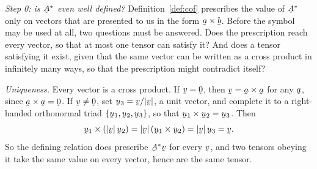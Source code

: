 \begin{solution}
\emph{Step 0: is $\bA^{*}$ even well defined?}
Definition~\ref{def:cof} prescribes the value of $\bA^{*}$ only on vectors
that are presented to us in the form $\ba\times\bb$. Before the symbol may
be used at all, two questions must be answered. Does the prescription reach
every vector, so that at most one tensor can satisfy it? And does a tensor
satisfying it exist, given that the same vector can be written as a cross
product in infinitely many ways, so that the prescription might contradict
itself?

\emph{Uniqueness.} Every vector is a cross product. If $\bv=\bze$, then
$\bv=\ba\times\ba$ for any $\ba$, since $\ba\times\ba=\bze$. If
$\bv\neq\bze$, set $\bu_{3}=\bv/|\bv|$, a unit vector, and complete it to a
right-handed orthonormal triad $\{\bu_{1},\bu_{2},\bu_{3}\}$, so that
$\bu_{1}\times\bu_{2}=\bu_{3}$. Then
\[
   \bu_{1}\times(|\bv|\,\bu_{2})=|\bv|\,(\bu_{1}\times\bu_{2})
   =|\bv|\,\bu_{3}=\bv .
\]
So the defining relation does prescribe $\bA^{*}\bv$ for every $\bv$, and
two tensors obeying it take the same value on every vector, hence are the
same tensor.


\end{solution}
